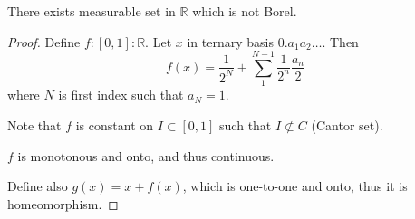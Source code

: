 \begin{theorem}
	There exists measurable set in $\mathbb{R}$ which is not Borel.
	\begin{proof}
		Define $f: [0,1]:\mathbb{R}$. Let $x$ in ternary basis $0.a_1a_2\dots$. Then
		$$f(x) = \frac{1}{2^N}+\sum_{1}^{N-1} \frac{1}{2^n} \frac{a_n}{2} $$
		where $N$ is first index such that $a_N=1$.
		
		Note that $f$ is constant on $I\subset [0,1]$ such that $I \not\subset C$ (Cantor set).
		
		$f$ is monotonous and onto, and thus continuous.
		
		Define also $g(x) = x+f(x)$, which is one-to-one and onto, thus it is homeomorphism.
	\end{proof}
\end{theorem}
